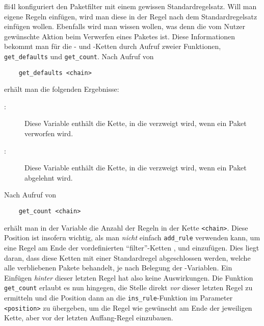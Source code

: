 fli4l konfiguriert den Paketfilter mit einem gewissen
Standardregelsatz. Will man eigene Regeln einfügen, wird man diese in
der Regel nach dem Standardregelsatz einfügen wollen. Ebenfalls wird
man wissen wollen, was denn die vom Nutzer gewünschte Aktion beim
Verwerfen eines Paketes ist. Diese Informationen bekommt man für die
- und -Ketten durch Aufruf zweier Funktionen,
\texttt{get\_defaults} und \texttt{get\_count}. Nach Aufruf von

\begin{example}
\begin{verbatim}
    get_defaults <chain>
\end{verbatim}
\end{example}

erhält man die folgenden Ergebnisse:

\begin{description}
\item[:] Diese Variable enthält die Kette, in die verzweigt wird,
  wenn ein Paket verworfen wird.
\item[:] Diese Variable enthält die Kette, in die verzweigt wird,
  wenn ein Paket abgelehnt wird.
\end{description}

Nach Aufruf von

\begin{example}
\begin{verbatim}
    get_count <chain>
\end{verbatim}
\end{example}

erhält man in der Variable  die Anzahl der Regeln in der Kette
\texttt{<chain>}. Diese Position ist insofern wichtig, als man \emph{nicht}
einfach \texttt{add\_rule} verwenden kann, um eine Regel am Ende der
vordefinierten "`filter"'-Ketten ,  und
 einzufügen. Dies liegt daran, dass diese Ketten mit einer
Standardregel abgeschlossen werden, welche alle verbliebenen Pakete behandelt,
je nach Belegung der -Variablen. Ein Einfügen
\emph{hinter} dieser letzten Regel hat also keine Auswirkungen. Die Funktion
\texttt{get\_count} erlaubt es nun hingegen, die Stelle direkt \emph{vor}
dieser letzten Regel zu ermitteln und die Position dann an die
\texttt{ins\_rule}-Funktion im Parameter \texttt{<position>} zu übergeben, um
die Regel wie gewünscht am Ende der jeweiligen Kette, aber vor der letzten
Auffang-Regel einzubauen.

